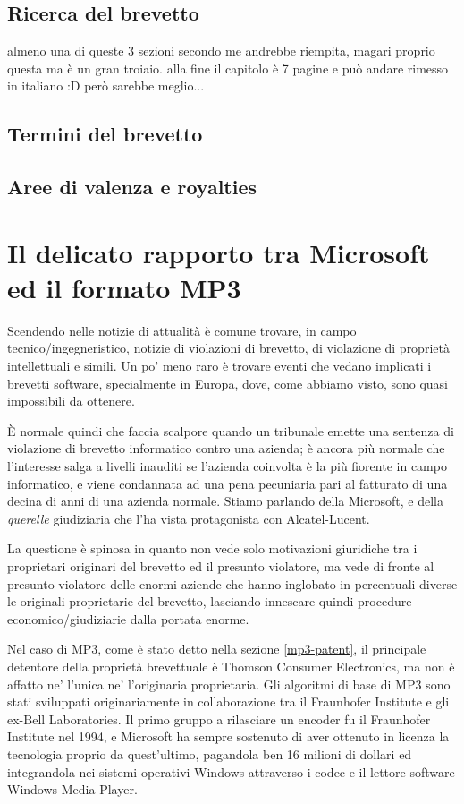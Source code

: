 \subsection{Ricerca del brevetto}
almeno una di queste 3 sezioni secondo me andrebbe riempita, magari proprio questa ma è un gran troiaio. alla fine il capitolo è 7 pagine e può andare rimesso in italiano :D però sarebbe meglio...
\subsection{Termini del brevetto}

\subsection{Aree di valenza e royalties}

\section{Il delicato rapporto tra Microsoft ed il formato MP3}
Scendendo nelle notizie di attualità è comune trovare, in campo tecnico/ingegneristico, notizie di violazioni di brevetto, di violazione di proprietà intellettuali e simili. Un po' meno raro è trovare eventi che vedano implicati i brevetti software, specialmente in Europa, dove, come abbiamo visto, sono quasi impossibili da ottenere. 

\`E normale quindi che faccia scalpore quando un tribunale emette una sentenza di violazione di brevetto informatico contro una azienda; è ancora più normale che l'interesse salga a livelli inauditi se l'azienda coinvolta è la più fiorente in campo informatico, e viene condannata ad una pena pecuniaria pari al fatturato di una decina di anni di una azienda normale. Stiamo parlando della Microsoft, e della \textit{querelle} giudiziaria che l'ha vista protagonista con Alcatel-Lucent.

La questione è spinosa in quanto non vede solo motivazioni giuridiche tra i proprietari originari del brevetto ed il presunto violatore, ma vede di fronte al presunto violatore delle enormi aziende che hanno inglobato in percentuali diverse le originali proprietarie del brevetto, lasciando innescare quindi procedure economico/giudiziarie dalla portata enorme.

Nel caso di MP3, come è stato detto nella sezione \ref{mp3-patent}, il principale detentore della proprietà brevettuale è Thomson Consumer Electronics, ma non è affatto ne' l'unica ne' l'originaria proprietaria. Gli algoritmi di base di MP3 sono stati sviluppati originariamente in collaborazione tra il Fraunhofer Institute e gli ex-Bell Laboratories. Il primo gruppo a rilasciare un encoder fu il Fraunhofer Institute nel 1994, e Microsoft ha sempre sostenuto di aver ottenuto in licenza la tecnologia proprio da quest'ultimo, pagandola ben 16 milioni di dollari ed integrandola nei sistemi operativi Windows attraverso i codec e il lettore software Windows Media Player.

